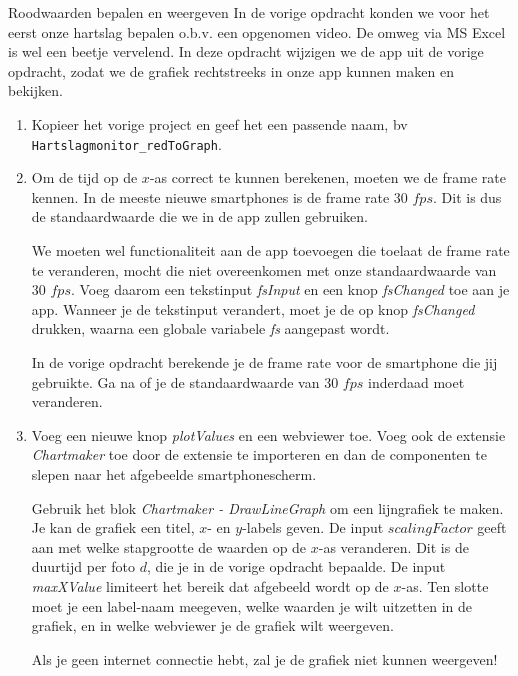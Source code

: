 \begin{opdracht}{Roodwaarden bepalen en weergeven}
	In de vorige opdracht konden we voor het eerst onze hartslag bepalen o.b.v. een opgenomen video. De omweg via MS Excel is wel een beetje vervelend. In deze opdracht wijzigen we de app uit de vorige opdracht, zodat we de grafiek rechtstreeks in onze app kunnen maken en bekijken.
	
	\begin{enumerate}
		\item Kopieer het vorige project en geef het een passende naam, bv \texttt{Hartslagmonitor\_redToGraph}. 
		\item Om de tijd op de $x$-as correct te kunnen berekenen, moeten we de frame rate kennen. In de meeste nieuwe smartphones is de frame rate 30 $fps$. Dit is dus de standaardwaarde die we in de app zullen gebruiken.
		
		We moeten wel functionaliteit aan de app toevoegen die toelaat de frame rate te veranderen, mocht die niet overeenkomen met onze standaardwaarde van 30 $fps$. Voeg daarom een tekstinput \emph{fsInput} en een knop \emph{fsChanged} toe aan je app. Wanneer je de tekstinput verandert, moet je de op knop \emph{fsChanged} drukken, waarna een globale variabele \emph{fs} aangepast wordt.
		
		In de vorige opdracht berekende je de frame rate voor de smartphone die jij gebruikte. Ga na of je de standaardwaarde van 30 $fps$ inderdaad moet veranderen.
		
		\item Voeg een nieuwe knop \emph{plotValues} en een webviewer toe. Voeg ook de extensie \emph{Chartmaker} toe door de extensie te importeren en dan de componenten te slepen naar het afgebeelde smartphonescherm.
		
		Gebruik het blok \emph{Chartmaker - DrawLineGraph} om een lijngrafiek te maken. Je kan de grafiek een titel, $x$- en $y$-labels geven. De input $scalingFactor$ geeft aan met welke stapgrootte de waarden op de $x$-as veranderen. Dit is de duurtijd per foto $d$, die je in de vorige opdracht bepaalde. De input \emph{maxXValue} limiteert het bereik dat afgebeeld wordt op de $x$-as. Ten slotte moet je een label-naam meegeven, welke waarden je wilt uitzetten in de grafiek, en in welke webviewer je de grafiek wilt weergeven.
		
		\begin{opmerking}
			Als je geen internet connectie hebt, zal je de grafiek niet kunnen weergeven! 
		\end{opmerking}
	\end{enumerate}
\end{opdracht}
	



